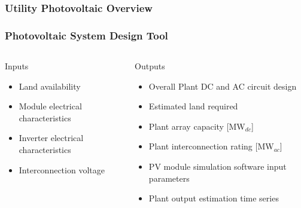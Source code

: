 \documentclass[aspectratio=169]{beamer}
\begin{document}
\begin{frame}
  \frametitle{Utility Photovoltaic Overview}
\end{frame}
  
\begin{frame}
  \frametitle{Photovoltaic System Design Tool}
  \begin{columns}[t]
    \begin{block}{Inputs}
      \begin{itemize}
      \item Land availability
      \item Module electrical characteristics
      \item Inverter electrical characteristics
      \item Interconnection voltage
      \end{itemize}
    \end{block}

    \begin{block}{Outputs}
      \begin{itemize}
      \item Overall Plant DC and AC circuit design
      \item Estimated land required
      \item Plant array capacity [MW$_{dc}$]
      \item Plant interconnection rating [MW$_{ac}$]
      \item PV module simulation software input parameters
      \item Plant output estimation time series
      \end{itemize}
    \end{block}
  \end{columns}
\end{frame}
\end{document}
